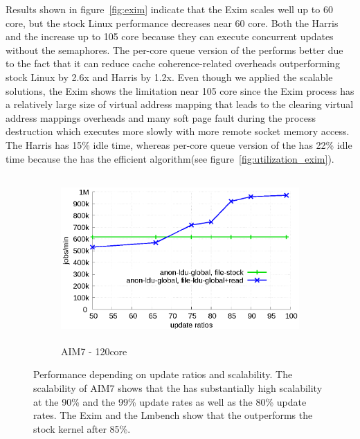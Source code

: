 Results shown in figure~\ref{fig:exim} indicate that the Exim scales well up to
60 core, but the stock Linux performance decreases near 60 core.
Both the Harris and the \LDU increase up to 105 core because they can execute
concurrent updates without the semaphores.
The per-core queue version of the \LDU performs better due to the fact that it can reduce
cache coherence-related overheads outperforming stock Linux by 2.6x and Harris
by 1.2x.
Even though we applied the scalable solutions, the Exim shows the limitation
near 105 core since the Exim process has a relatively large size of virtual
address mapping that leads to the clearing virtual address mappings overheads
and many soft page fault during the process destruction which executes more
slowly with more remote socket memory access.
The Harris has 15\% idle time, whereas per-core queue version of the \LDU
has 22\% idle time because the \LDU has the efficient algorithm(see
figure~\ref{fig:utilization_exim}).

\begin{figure}[t!]
    \centering
    \begin{subfigure}[b]{1\textwidth}
  \begin{center}
        \includegraphics[height=2.5in]{graph/ratio_aim7.eps}
        \caption{AIM7 - 120core}
  \end{center}
    \end{subfigure}%
    \caption{Performance depending on update ratios and scalability.
    The scalability of AIM7 shows that the \LDU has substantially high
    scalability at the 90\% and the 99\% update rates as well as
    the 80\% update rates. The Exim and the Lmbench show that the \LDU outperforms the stock kernel after 85\%.}
    \label{fig:UpdateRate_aim7}
\end{figure}

